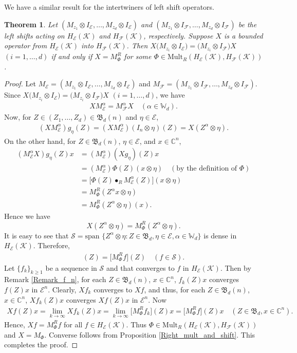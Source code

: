 \documentclass[12pt]{amsart}%
\newtheorem{theorem}{Theorem}[section]
\numberwithin{equation}{section}
\newcommand{\fB}{{\mathfrak{B}}}
\newcommand{\cle}{\mathcal{E}}
\newcommand{\clf}{\mathcal{F}}
\newcommand{\clk}{\mathcal{K}}
\newcommand{\cls}{\mathcal{S}}
\newcommand{\C}{\mathbb{C}}
\begin{document}
We have a similar result for the intertwiners of left shift operators.
\begin{theorem}\label{intertwiner of left shifts}
Let $(M_{z_1} \otimes I_{\cle}, \ldots, M_{z_d}\otimes I_{\cle})$ and $(M_{z_1} \otimes I_{\clf}, \ldots, M_{z_d}\otimes I_{\clf})$ be the left shifts acting on $H_\cle(\clk)$ and $H_\clf(\clk)$, respectively. Suppose $X$ is a bounded operator from $H_\cle(\clk)$ into $H_\clf(\clk)$. Then $X \big (M_{z_i} \otimes I_{\cle}\big)= \big(M_{z_i} \otimes I_{\clf}\big) X$ $(i=1, \ldots, d)$ if and only if $X=M^R_\Phi$ for some $\Phi\in \text{Mult}_R(H_\cle(\clk), H_\clf(\clk))$.
\end{theorem}
\begin{proof}
Let $M_\cle=(M_{z_1} \otimes I_{\cle}, \ldots, M_{z_d}\otimes I_{\cle})$ and $M_\clf=(M_{z_1} \otimes I_{\clf}, \ldots, M_{z_d}\otimes I_{\clf})$. Since $X \big (M_{z_i} \otimes I_{\cle}\big)= \big(M_{z_i} \otimes I_{\clf}\big) X$ $(i=1, \ldots, d)$, we have 
\begin{align*}
X M^\alpha_\cle=M^\alpha_\clf X\quad (\alpha\in \mathbb{W}_d).
\end{align*}
Now, for $Z\in(Z_1, \ldots, Z_d)\in\fB_d(n)$ and $\eta\in \cle$,
\begin{align*}
(X M^\alpha_\cle) g_\eta(Z)=(X M^\alpha_\cle) (I_n\otimes \eta)(Z)=X (Z^{\alpha} \otimes \eta).
\end{align*}
On the other hand, for $Z\in\fB_d(n)$, $\eta\in \cle$, and $x\in \C^n$,
\begin{align*}
(M^\alpha_\cle X) g_\eta(Z)x &=(M^\alpha_\cle) (X g_\eta)(Z)x\\
&=(M^\alpha_\cle)\Phi(Z)(x\otimes\eta) \quad (\text{by the definition of $\Phi$})\\
&=\big[\Phi(Z)\bullet_R M^\alpha_\cle(Z)\big](x\otimes\eta)\\
&=M^R_\Phi(Z^\alpha x \otimes \eta)\\
&=M^R_\Phi(Z^\alpha  \otimes \eta)(x).
\end{align*}
Hence we have 
\[
X(Z^\alpha \otimes\eta)=M^R_\Phi(Z^\alpha  \otimes \eta).
\]
 It is easy to see that $\cls=\text{span } \{Z^\alpha\otimes\eta : Z\in\fB_d, \eta\in \cle, \alpha\in \mathbb{W}_d\}$ is dense in $H_\cle(\clk)$. Therefore,
\begin{align*}
[Xf](Z)=\big[M^R_\Phi f\big](Z) \quad (f\in \cls).
\end{align*}
Let $\{f_k\}_{k\geq 1}$ be a sequence in $\cls$ and that converges to $f$ in $H_\cle(\clk)$. Then by Remark \ref{Remark_f_n}, for each $Z\in \fB_d(n)$, $x\in \C^n$, $f_k(Z)x$ converges  $f(Z)x$ in  $\cle^n$. Clearly, $X f_k$ converges to $X f$, and thus, for each $Z\in \fB_d(n)$, $x\in \C^n$, $Xf_k(Z)x$ converges  $Xf(Z)x$ in  $\cle^n$. 
Now 
\begin{align*}
Xf(Z)x=\lim_{k\to \infty} X f_k(Z)x= \lim_{k\to \infty}\big[M^R_\Phi f_k\big](Z)x=\big[M^R_\Phi f\big](Z)x  \quad (Z\in \fB_d, x\in \C^n).
\end{align*}
Hence, $Xf=M^R_\Phi f$ for all $f\in H_\cle(\clk)$. Thus $\Phi\in \text{Mult}_R(H_\cle(\clk), H_\clf(\clk))$ and $X=M_{\Phi}$.
Converse follows from Proposition \ref{Right_mult_and_shift}. This completes the proof.
\end{proof}
\end{document}
